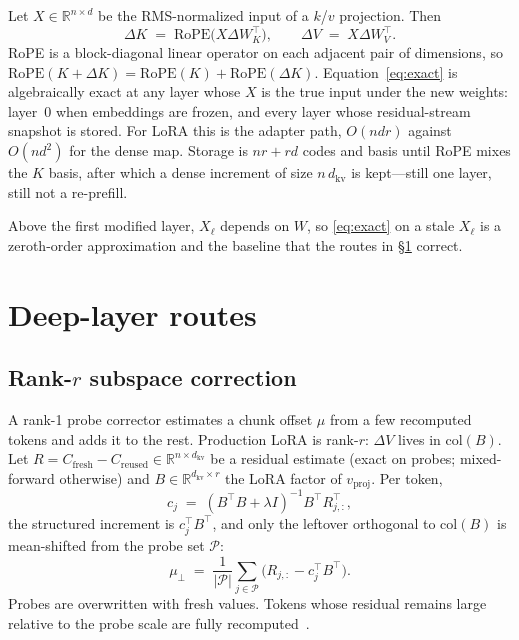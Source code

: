\documentclass{article}
\begin{document}
Let $X\in\mathbb{R}^{n\times d}$ be the RMS-normalized input of a
$k$/$v$ projection.
Then
\begin{equation}
  \label{eq:exact}
  \Delta K \;=\; \mathrm{RoPE}\!\bigl(X\Delta W_K^\top\bigr),\qquad
  \Delta V \;=\; X\Delta W_V^\top.
\end{equation}
RoPE is a block-diagonal linear operator on each adjacent pair of
dimensions, so
$\mathrm{RoPE}(K+\Delta K)=\mathrm{RoPE}(K)+\mathrm{RoPE}(\Delta K)$.
Equation~\eqref{eq:exact} is algebraically exact at any layer whose $X$
is the true input under the new weights: layer~$0$ when embeddings are
frozen, and every layer whose residual-stream snapshot is stored.
For LoRA this is the adapter path, $O(ndr)$ against $O(nd^2)$ for the
dense map.
Storage is $nr+rd$ codes and basis until RoPE mixes the $K$ basis, after
which a dense increment of size $n\,d_{\mathrm{kv}}$ is kept---still one
layer, still not a re-prefill.

Above the first modified layer, $X_\ell$ depends on $W$, so
\eqref{eq:exact} on a stale $X_\ell$ is a zeroth-order approximation and
the baseline that the routes in \S\ref{sec:deep} correct.

\section{Deep-layer routes}
\label{sec:deep}

\subsection{Rank-\texorpdfstring{$r$}{r} subspace correction}
\label{sec:subspace}

A rank-1 probe corrector estimates a chunk offset $\hat\mu$ from a few
recomputed tokens and adds it to the rest.
Production LoRA is rank-$r$: $\Delta V$ lives in $\mathrm{col}(B)$.
Let $R=C_{\mathrm{fresh}}-C_{\mathrm{reused}}\in\mathbb{R}^{n\times d_{\mathrm{kv}}}$
be a residual estimate (exact on probes; mixed-forward otherwise) and
$B\in\mathbb{R}^{d_{\mathrm{kv}}\times r}$ the LoRA factor of
$v_{\mathrm{proj}}$.
Per token,
\begin{equation}
  \label{eq:ls}
  c_j
  \;=\;
  (B^\top B+\lambda I)^{-1} B^\top R_{j,:}^\top,
\end{equation}
the structured increment is $c_j^\top B^\top$, and only the leftover
orthogonal to $\mathrm{col}(B)$ is mean-shifted from the probe set
$\mathcal{P}$:
\begin{equation}
  \mu_\perp
  \;=\;
  \frac{1}{|\mathcal{P}|}\sum_{j\in\mathcal{P}}
  \bigl(R_{j,:}-c_j^\top B^\top\bigr).
\end{equation}
Probes are overwritten with fresh values.
Tokens whose residual remains large relative to the probe scale are
fully recomputed~\citep{yao2024cacheblend}.
\end{document}
